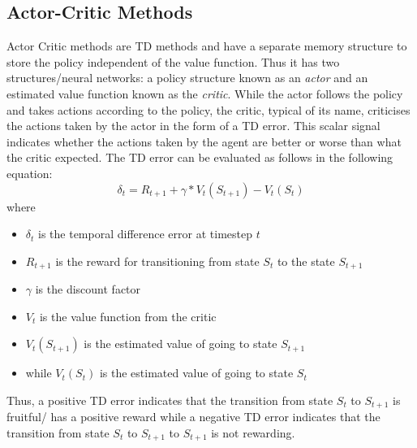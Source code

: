 \documentclass{article}
\begin{document}


\subsection{Actor-Critic Methods}
 Actor Critic methods are TD methods and have a separate memory structure to store the policy independent of the value function. Thus it has two  structures/neural networks: a policy structure known as an \emph{actor} and an estimated value function known as the \emph{critic}. While the actor follows the policy and takes actions according to the policy, the critic, typical of its name, criticises the actions taken by the actor in the form of a TD error. This scalar signal indicates whether the actions taken by the agent are better or worse than what the critic expected. The TD error can be evaluated as follows in the following equation: \newline
\begin{equation*}
\delta_{t} = R_{t+1} + \gamma * V_t(S_{t+1})-V_t(S_t)
\end{equation*}
 \newline
 where 
 \begin{itemize}
\renewcommand\labelitemi{.}
\item $\delta_{t}$ is the temporal difference error at timestep $t$
\item $R_{t+1}$ is the reward for transitioning from state $S_t$ to the state $S_{t+1}$
\item $\gamma$ is the discount factor
\item $V_{t}$ is the value function from the critic
\item $V_t(S_{t+1})$ is the estimated value of going to state $S_{t+1}$
\item while $V_t(S_t)$ is the estimated value of going to state $S_t$
\end{itemize}
Thus, a positive TD error indicates that the transition from state $S_t$ to $S_{t+1}$ is fruitful/ has a positive reward while a negative TD error indicates that the transition from state  $S_t$ to $S_{t+1}$ to $S_{t+1}$ is not rewarding.
 \newline
\end{document}
